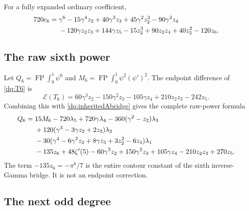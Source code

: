 For a fully expanded ordinary coefficient,
\begin{align}
 720c_6={}&\gamma^6-15\gamma^4z_2+40\gamma^3z_3
       +45\gamma^2z_2^2-90\gamma^2z_4\notag\\
 &-120\gamma z_2z_3+144\gamma z_5
       -15z_2^3+90z_2z_4+40z_3^2-120z_6.
 \label{dq:c6}
\end{align}

\subsection{The raw sixth power}

Let $Q_6=\operatorname{FP}\int_0^1\psi^6$ and
$M_6=\operatorname{FP}\int_0^1\psi^2(\psi')^2$.
The endpoint difference of \eqref{dq:T6} is
\begin{equation}\label{dq:rawsixthendpoint}
 \mathcal E(T_6)=60\gamma^3z_2-150\gamma^2z_3-105\gamma z_4
                              +210z_2z_3-242z_5.
\end{equation}
Combining this with \eqref{dq:inheritedAbridge} gives the complete
raw-power formula
\begin{align}
 Q_6={}&15M_6-720\lambda_5+720\gamma\lambda_4
          -360(\gamma^2-z_2)\lambda_3\notag\\
 &+120(\gamma^3-3\gamma z_2+2z_3)\lambda_2\notag\\
 &-30(\gamma^4-6\gamma^2z_2+8\gamma z_3
                       +3z_2^2-6z_4)\lambda_1\notag\\
 &-135z_6+48\zeta'(5)-60\gamma^3z_2+150\gamma^2z_3
             +105\gamma z_4-210z_2z_3+270z_5.
 \label{dq:rawsixth}
\end{align}
The term $-135z_6=-\pi^6/7$ is the entire contour constant of
the sixth inverse-Gamma bridge. It is not an endpoint correction.

\subsection{The next odd degree}

